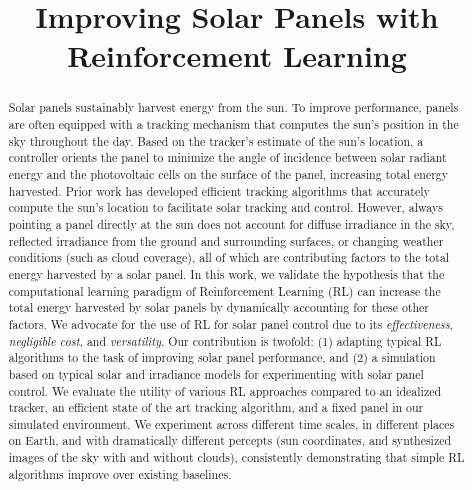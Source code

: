 \documentclass{article}
\title{Improving Solar Panels with Reinforcement Learning}
\begin{document}
\maketitle

\begin{abstract}
Solar panels sustainably harvest energy from the sun. To improve performance, panels are often equipped with a tracking mechanism that computes the sun's position in the sky throughout the day. Based on the tracker's estimate of the sun's location, a controller orients the panel to minimize the angle of incidence between solar radiant energy and the photovoltaic cells on the surface of the panel, increasing total energy harvested. Prior work has developed efficient tracking algorithms that accurately compute the sun's location to facilitate solar tracking and control.
%
However, always pointing a panel directly at the sun does not account for diffuse irradiance in the sky, reflected irradiance from the ground and surrounding surfaces, or changing weather conditions (such as cloud coverage), all of which are contributing factors to the total energy harvested by a solar panel.
%
In this work, we validate the hypothesis that the computational learning paradigm of Reinforcement Learning (RL) can increase the total energy harvested by solar panels by dynamically accounting for these other factors. We advocate for the use of RL for solar panel control due to its {\it effectiveness}, {\it negligible cost}, and {\it versatility}. Our contribution is twofold: (1) adapting typical RL algorithms to the task of improving solar panel performance, and (2) a simulation based on typical solar and irradiance models for experimenting with solar panel control.
%
We evaluate the utility of various RL approaches compared to an idealized tracker, an efficient state of the art tracking algorithm, and a fixed panel in our simulated environment. We experiment across different time scales, in different places on Earth, and with dramatically different percepts (sun coordinates, and synthesized images of the sky with and without clouds), consistently demonstrating that simple RL algorithms improve over existing baselines.
\end{abstract}


\end{document}

